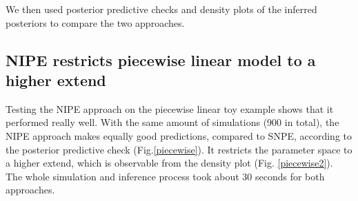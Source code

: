 \documentclass[12pt]{extreport}
\begin{document}
We then used posterior predictive checks  and density plots of the inferred posteriors to compare the two approaches. 

\subsection{NIPE restricts piecewise linear model to a higher extend}

Testing the NIPE approach on the piecewise linear toy example shows that it performed really well. With the same amount of simulations (900 in total), the NIPE approach makes equally good predictions, compared to SNPE, according to the posterior predictive check (Fig.\ref{piecewise}). It restricts the parameter space to a higher extend, which is observable from the density plot (Fig. \ref{piecewise2}).\\
The whole simulation and inference process took about 30 seconds for both approaches.
\end{document}
